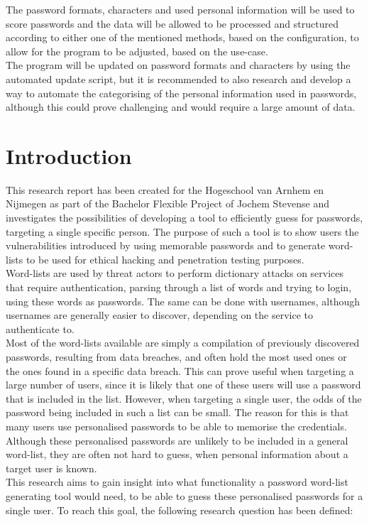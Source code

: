 \documentclass[a4paper,12pt]{article}
\begin{document}
The password formats, characters and used personal information will be used to score passwords and the data will be allowed to be processed and structured according to either one of the mentioned methods, based on the configuration, to allow for the program to be adjusted, based on the use-case.\\
The program will be updated on password formats and characters by using the automated update script, but it is recommended to also research and develop a way to automate the categorising of the personal information used in passwords, although this could prove challenging and would require a large amount of data.

\newpage
  
\tableofcontents

\newpage
\section{Introduction}
\label{ch:intro}
This research report has been created for the Hogeschool van Arnhem en Nijmegen as part of the Bachelor Flexible Project of Jochem Stevense and investigates the possibilities of developing a tool to efficiently guess for passwords, targeting a single specific person. The purpose of such a tool is to show users the vulnerabilities introduced by using memorable passwords and to generate word-lists to be used for ethical hacking and penetration testing purposes.\\

Word-lists are used by threat actors to perform dictionary attacks on services that require authentication, parsing through a list of words and trying to login, using these words as passwords. The same can be done with usernames, although usernames are generally easier to discover, depending on the service to authenticate to.\\
Most of the word-lists available are simply a compilation of previously discovered passwords, resulting from data breaches, and often hold the most used ones or the ones found in a specific data breach. This can prove useful when targeting a large number of users, since it is likely that one of these users will use a password that is included in the list. However, when targeting a single user, the odds of the password being included in such a list can be small. The reason for this is that many users use personalised passwords to be able to memorise the credentials. Although these personalised passwords are unlikely to be included in a general word-list, they are often not hard to guess, when personal information about a target user is known.\\
This research aims to gain insight into what functionality a password word-list generating tool would need, to be able to guess these personalised passwords for a single user. To reach this goal, the following research question has been defined:\\
\end{document}
